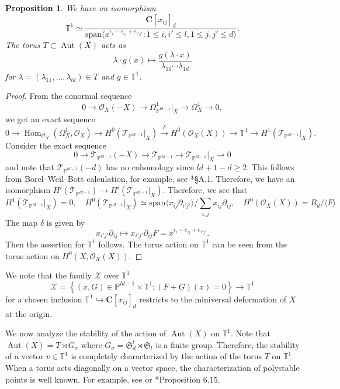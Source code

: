 \documentclass[letterpaper,11pt]{amsart}
\theoremstyle{plain}
\newtheorem{prop}[theo]{Proposition}
\theoremstyle{definition}
\theoremstyle{remark}
\newcommand{\eps}{\epsilon}
\newcommand{\bb}[1]{\mathbb{#1}}
\newcommand{\PP}{\mathbb{P}}
\newcommand{\CC}{\mathbf{C}}
\newcommand{\cO}{\mathcal{O}}
\newcommand{\cT}{\mathcal{T}}
\newcommand{\cX}{\mathcal{X}}
\DeclareMathOperator{\Hom}{Hom}
\DeclareMathOperator{\Aut}{Aut}
\newcommand{\de}{\partial}
\begin{document}
    \begin{prop} \label{prop:deformation-space-of-X}
        We have an isomorphism
        $$ \bb{T}^{1} \simeq \frac{\CC[x_{ij}]_{d}}{\mathrm{span}\langle x^{\eps_{i} - e_{ij} + e_{i'j'}} : 1 \leq i, i' \leq l, 1\leq j,j'\leq d \rangle}.$$
        The torus $T \subset \Aut(X)$ acts as
        $$ \lambda \cdot g(x) \mapsto \frac{g(\lambda \cdot x)}{\lambda_{11}\cdots \lambda_{1d}}$$
        for $\lambda = (\lambda_{11},\ldots, \lambda_{ld}) \in T$ and $g \in \bb{T}^{1}$.
    \end{prop}

    \begin{proof}
        From the conormal sequence
        $$ 0 \to \cO_{X}(-X) \to \Omega_{\PP^{ld-1}}^{1}|_{X} \to \Omega_{X}^{1} \to 0,$$
        we get an exact sequence
        $$0 \to \Hom_{\cO_{X}}(\Omega_{X}^{1} ,\cO_{X}) \to H^{0}(\cT_{\PP^{ld-1}}|_{X}) \xrightarrow{\delta} H^{0}(\cO_{X}(X)) \to \bb{T}^{1} \to H^{1}(\cT_{\PP^{ld-1}}|_{X}).$$
        Consider the exact sequence
        $$ 0 \to \cT_{\PP^{ld-1}}(-X) \to \cT_{\PP^{ld-1}} \to \cT_{\PP^{ld-1}}|_{X} \to 0$$
        and note that $\cT_{\PP^{ld-1}}(-d)$ has no cohomology since $ld + 1 - d \geq 2$. This follows from Borel--Weil--Bott calculation, for example, see \cite{Borisov-C-Perry}*{\S A.1}. Therefore, we have an isomorphism $H^{i}(\cT_{\PP^{ld-1}}) \to H^{i}(\cT_{\PP^{ld-1}}|_{X})$. Therefore, we see that
        $$ H^{1}(\cT_{\PP^{ld-1}}|_{X}) = 0, \quad H^{0}(\cT_{\PP^{ld-1}}|_{X}) \simeq \mathrm{span}\langle x_{ij} \de_{i'j'} \rangle\Big/\sum_{i,j} x_{ij}\de_{ij}, \quad H^{0}(\cO_{X}(X)) = R_{d}/\langle F \rangle $$
        The map $\delta$ is given by
        $$ x_{i'j'} \de_{ij} \mapsto x_{i'j'}\de_{ij} F = x^{\eps_{i} - e_{ij} + e_{i'j'}}.$$
        Then the assertion for $\bb{T}^{1}$ follows. The torus action on $\bb{T}^{1}$ can be seen from the torus action on $H^{0}(X, \cO_{X}(X))$.
    \end{proof}

    We note that the family $\cX$ over $\bb{T}^{1}$
    $$ \cX = \left\{ (x, G) \in \PP^{ld-1} \times \bb{T}^{1} : (F + G)(x) = 0 \right\} \to \bb{T}^{1}$$
    for a chosen inclusion $\mathbb{T}^{1} \hookrightarrow \CC[x_{ij}]_{d}$ restricts to the miniversal deformation of $X$ at the origin.

    We now analyze the stability of the action of $\Aut(X)$ on $\bb{T}^1$. Note that $\Aut(X) = T \rtimes G_{\sigma}$ where $G_{\sigma} = \mathfrak{S}_{d}^{l} \rtimes \mathfrak{S}_{l}$ is a finite group. Therefore, the stability of a vector $v \in \bb{T}^{1}$ is completely characterized by the action of the torus $T$ on $\bb{T}^{1}$. When a torus acts diagonally on a vector space, the characterization of polystable points is well known. For example, see \cite{Dolgachev-Invariant-theory} or \cite{Popov:invariant-theory}*{Proposition 6.15}.
\end{document}
